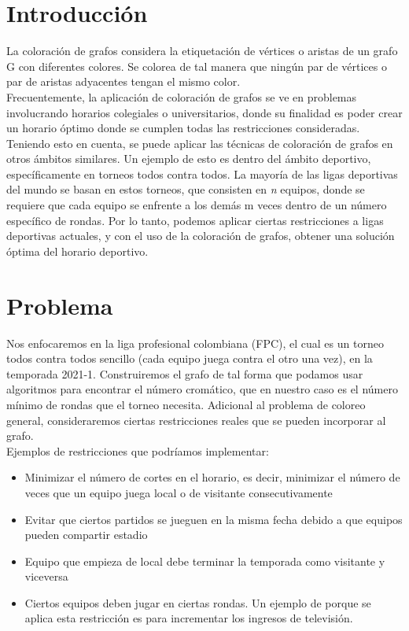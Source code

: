 \documentclass[11pt]{article}
\begin{document}
    \begin{multicols}{2}
    \setcounter{page}{1}

        \section{Introducción}
            La coloración de grafos considera la etiquetación de vértices o aristas de un grafo G con diferentes colores. 
            Se colorea de tal manera que ningún par de vértices o par de aristas adyacentes tengan el mismo color.\\
            Frecuentemente, la aplicación de coloración de grafos se ve en problemas involucrando horarios colegiales o 
            universitarios, donde su finalidad es poder crear un horario óptimo donde se cumplen todas las restricciones consideradas. 
            Teniendo esto en cuenta, se puede aplicar las técnicas de coloración de grafos en otros ámbitos similares. 
            Un ejemplo de esto es dentro del ámbito deportivo, específicamente en torneos todos contra todos. La mayoría de las 
            ligas deportivas del mundo se basan en estos torneos, que consisten en \textit{n} equipos, donde se requiere que cada equipo se 
            enfrente a los demás m veces dentro de un número específico de rondas. Por lo tanto, podemos aplicar ciertas 
            restricciones a ligas deportivas actuales, y con el uso de la coloración de grafos, obtener una solución óptima 
            del horario deportivo. 

        \section{Problema}
            Nos enfocaremos en la liga profesional colombiana (FPC), el cual es un torneo todos contra todos sencillo 
            (cada equipo juega contra el otro una vez), en la temporada 2021-1. Construiremos el grafo de tal forma que podamos 
            usar algoritmos para encontrar el número cromático, que en nuestro caso es el número mínimo de rondas que el torneo necesita.
            Adicional al problema de coloreo general, consideraremos ciertas restricciones reales que se pueden incorporar al grafo.\\[10pt]
            Ejemplos de restricciones que podríamos implementar:

            \begin{itemize}
                \item Minimizar el número de cortes en el horario, es decir, minimizar el número de veces que un equipo juega local o de visitante consecutivamente
                \item Evitar que ciertos partidos se jueguen en la misma fecha debido a que equipos pueden compartir estadio
                \item Equipo que empieza de local debe terminar la temporada como visitante y viceversa
            \item Ciertos equipos deben jugar en ciertas rondas. Un ejemplo de porque se aplica esta restricción es para incrementar los ingresos de televisión.
            \end{itemize}
   

\end{multicols}
\end{document}
